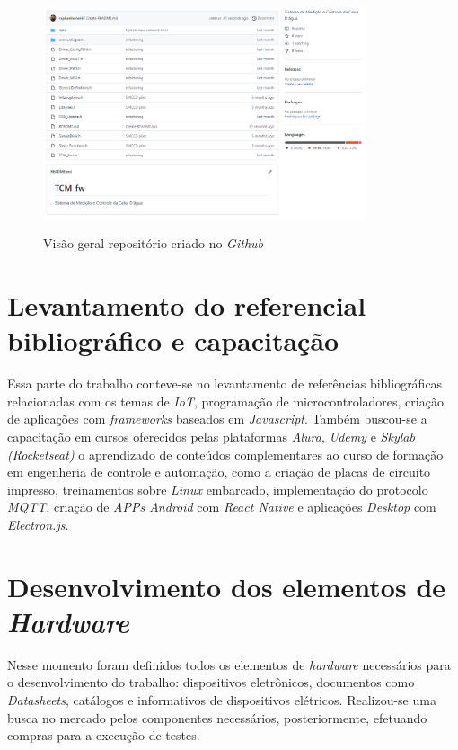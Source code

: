 \begin{figure}[H]
	\centering
	\caption{Visão geral repositório criado no \textit{Github}}
	\includegraphics[width=0.85\textwidth]{figuras/github.png}
	\label{fig:github}
\end{figure}



\section{Levantamento do referencial bibliográfico e capacitação}
\label{sec:metmodal}

Essa parte do trabalho conteve-se no levantamento de referências bibliográficas relacionadas com os temas de \textit{IoT}, programação de microcontroladores, criação de aplicações com \textit{frameworks} baseados em \textit{Javascript}. Também buscou-se a capacitação em cursos oferecidos pelas plataformas \textit{Alura}, \textit{Udemy} e \textit{Skylab (Rocketseat)} o aprendizado de conteúdos complementares ao curso de formação em engenheria de controle e automação, como a criação de placas de circuito impresso, treinamentos sobre \textit{Linux} embarcado, implementação do protocolo \textit{MQTT}, criação de \textit{APPs Android} com \textit{React Native} e aplicações \textit{Desktop} com \textit{Electron.js}.

\section{Desenvolvimento dos elementos de \textit{Hardware}}
\label{sec: dev_ele_hw}

Nesse momento foram definidos todos os elementos de \textit{hardware} necessários para o desenvolvimento do trabalho: dispositivos eletrônicos, documentos como \textit{Datasheets}, catálogos e informativos de dispositivos elétricos. Realizou-se uma busca no mercado pelos componentes necessários, posteriormente, efetuando compras para a execução de testes.


